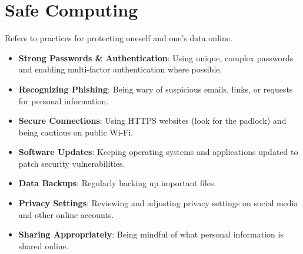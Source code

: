 \documentclass[11pt,oneside]{book}
\begin{document}
\section{Safe Computing}
\label{sec:safe_computing}
Refers to practices for protecting oneself and one's data online.
\begin{itemize}
    \item \textbf{Strong Passwords \& Authentication}: Using unique, complex passwords and enabling multi-factor authentication where possible.
    \item \textbf{Recognizing Phishing}: Being wary of suspicious emails, links, or requests for personal information.
    \item \textbf{Secure Connections}: Using HTTPS websites (look for the padlock) and being cautious on public Wi-Fi.
    \item \textbf{Software Updates}: Keeping operating systems and applications updated to patch security vulnerabilities.
    \item \textbf{Data Backups}: Regularly backing up important files.
    \item \textbf{Privacy Settings}: Reviewing and adjusting privacy settings on social media and other online accounts.
    \item \textbf{Sharing Appropriately}: Being mindful of what personal information is shared online.
\end{itemize}
\end{document}
